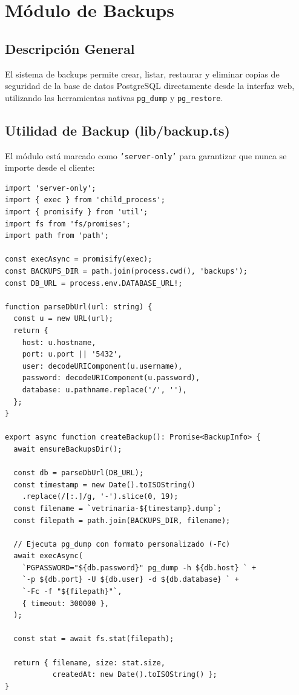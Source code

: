 \chapter{M\'odulo de Backups}

\section{Descripci\'on General}

El sistema de backups permite crear, listar, restaurar y eliminar copias
de seguridad de la base de datos PostgreSQL directamente desde la interfaz
web, utilizando las herramientas nativas \texttt{pg\_dump} y
\texttt{pg\_restore}.

\section{Utilidad de Backup (lib/backup.ts)}

El m\'odulo est\'a marcado como \texttt{'server-only'} para garantizar que
nunca se importe desde el cliente:

\begin{lstlisting}[style=typescript, caption=Backup utility - Creacion de backup]
import 'server-only';
import { exec } from 'child_process';
import { promisify } from 'util';
import fs from 'fs/promises';
import path from 'path';

const execAsync = promisify(exec);
const BACKUPS_DIR = path.join(process.cwd(), 'backups');
const DB_URL = process.env.DATABASE_URL!;

function parseDbUrl(url: string) {
  const u = new URL(url);
  return {
    host: u.hostname,
    port: u.port || '5432',
    user: decodeURIComponent(u.username),
    password: decodeURIComponent(u.password),
    database: u.pathname.replace('/', ''),
  };
}

export async function createBackup(): Promise<BackupInfo> {
  await ensureBackupsDir();

  const db = parseDbUrl(DB_URL);
  const timestamp = new Date().toISOString()
    .replace(/[:.]/g, '-').slice(0, 19);
  const filename = `vetrinaria-${timestamp}.dump`;
  const filepath = path.join(BACKUPS_DIR, filename);

  // Ejecuta pg_dump con formato personalizado (-Fc)
  await execAsync(
    `PGPASSWORD="${db.password}" pg_dump -h ${db.host} ` +
    `-p ${db.port} -U ${db.user} -d ${db.database} ` +
    `-Fc -f "${filepath}"`,
    { timeout: 300000 },
  );

  const stat = await fs.stat(filepath);

  return { filename, size: stat.size,
           createdAt: new Date().toISOString() };
}
\end{lstlisting}

